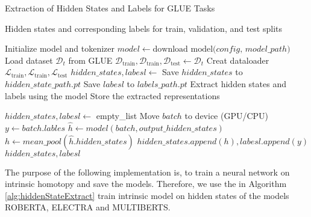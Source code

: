 \begin{algorithm}[H]
\caption{Extraction of Hidden States and Labels for GLUE Tasks}
\label{alg:hiddenStateExtractAbstract}
\begin{algorithmic}[htb]
\Require %
\Ensure Hidden states and corresponding labels for train, validation, and test splits

            \State Initialize model and tokenizer
            \State $model \gets \text{download model($config$, $model\_path$)}$
        \State Load dataset $\mathcal{D}_t$ from GLUE 
        \State  $\mathcal{D}_\text{train},
        \mathcal{D}_\text{train},\mathcal{D}_\text{test}\gets\mathcal{D}_t$ 
        \State Creat dataloader  $\mathcal{L}_\text{train},
        \mathcal{L}_\text{train},\mathcal{L}_\text{test}$
                    \State $hidden\_states, labesl \gets $
                    \State Save $hidden\_states$ to $hidden\_state\_path.pt$
                    \State Save $labesl$ to $labels\_path.pt$
                \EndFor
                \State Extract hidden states and labels using the model
                \State Store the extracted representations
        \EndFor
    \EndFor
\EndFor


  \State $hidden\_states,labesl\gets$ empty\_list
  \State Move $batch$ to device (GPU/CPU)
  \State $y\gets batch.lables$ 
  \State $\hat{h}\gets model(batch, output\_hidden\_states)$
  \State $h\gets mean\_pool(\hat{h}.hidden\_states)$ 
  \State $hidden\_states.append(h),labesl.append(y)$
  \EndFor
  \State \Return $hidden\_states,labesl$
\EndProcedure
\end{algorithmic}
\end{algorithm}


The purpose of the following implementation is, to train a neural network on intrinsic homotopy and save the models.
Therefore, we use the in Algorithm \ref{alg:hiddenStateExtract} train intrinsic model on  hidden states of the models  {ROBERTA}, {ELECTRA} and {MULTIBERTS}.

